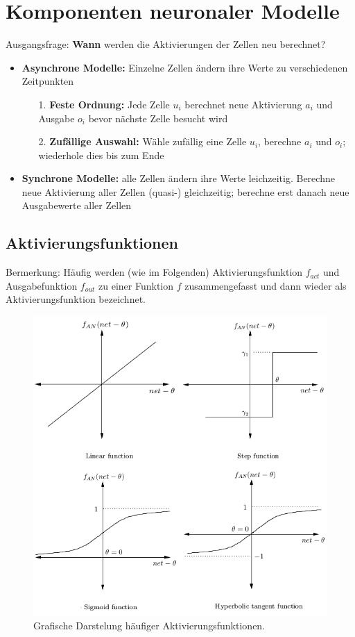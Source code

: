 \section*{Komponenten neuronaler Modelle}
Ausgangsfrage: \textbf{Wann} werden die Aktivierungen der Zellen neu berechnet?\\
\begin{itemize}
\item \textbf{Asynchrone Modelle:} Einzelne Zellen ändern ihre Werte zu verschiedenen Zeitpunkten
\begin{itemize}
\item[1.] \textbf{Feste Ordnung:} Jede Zelle $u_i$ berechnet neue Aktivierung $a_i$ und Ausgabe $o_i$ bevor nächste Zelle besucht wird
\item[2.] \textbf{Zufällige Auswahl:} Wähle zufällig eine Zelle $u_i$, berechne $a_i$ und $o_i$; wiederhole dies bis zum Ende
\end{itemize}
\item \textbf{Synchrone Modelle:} alle Zellen ändern ihre Werte leichzeitig. Berechne neue Aktivierung aller Zellen (quasi-) gleichzeitig; berechne erst danach neue Ausgabewerte aller Zellen 
\end{itemize}

\subsection*{Aktivierungsfunktionen}
Bermerkung: Häufig werden (wie im Folgenden) Aktivierungsfunktion $f_{act}$ und Ausgabefunktion $f_{out}$ zu einer Funktion $f$ zusammengefasst und dann wieder als Aktivierungsfunktion bezeichnet.

\begin{figure}[ht!] \centering 
	\includegraphics[width=\linewidth]{figures/ch01_fact.png}
	\caption{Grafische Darstelung häufiger Aktivierungsfunktionen.}
	\label{fig:ch01_fact}
\end{figure}

